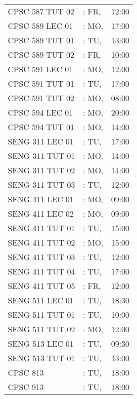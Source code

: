 \documentclass[11pt]{article}
\begin{document}
\begin{longtable}{l l r}
CPSC 587 TUT 02               &\hspace*{1.5cm}: FR,& 12:00\tabularnewline
CPSC 589 LEC 01               &\hspace*{1.5cm}: MO,& 17:00\tabularnewline
CPSC 589 TUT 01               &\hspace*{1.5cm}: TU,& 13:00\tabularnewline
CPSC 589 TUT 02               &\hspace*{1.5cm}: FR,& 10:00\tabularnewline
CPSC 591 LEC 01               &\hspace*{1.5cm}: MO,& 12:00\tabularnewline
CPSC 591 TUT 01               &\hspace*{1.5cm}: TU,& 17:00\tabularnewline
CPSC 591 TUT 02               &\hspace*{1.5cm}: MO,& 08:00\tabularnewline
CPSC 594 LEC 01               &\hspace*{1.5cm}: MO,& 20:00\tabularnewline
CPSC 594 TUT 01               &\hspace*{1.5cm}: MO,& 14:00\tabularnewline
SENG 311 LEC 01               &\hspace*{1.5cm}: TU,& 17:00\tabularnewline
SENG 311 TUT 01               &\hspace*{1.5cm}: MO,& 14:00\tabularnewline
SENG 311 TUT 02               &\hspace*{1.5cm}: MO,& 14:00\tabularnewline
SENG 311 TUT 03               &\hspace*{1.5cm}: TU,& 12:00\tabularnewline
SENG 411 LEC 01               &\hspace*{1.5cm}: MO,& 09:00\tabularnewline
SENG 411 LEC 02               &\hspace*{1.5cm}: MO,& 09:00\tabularnewline
SENG 411 TUT 01               &\hspace*{1.5cm}: TU,& 15:00\tabularnewline
SENG 411 TUT 02               &\hspace*{1.5cm}: MO,& 15:00\tabularnewline
SENG 411 TUT 03               &\hspace*{1.5cm}: TU,& 12:00\tabularnewline
SENG 411 TUT 04               &\hspace*{1.5cm}: TU,& 17:00\tabularnewline
SENG 411 TUT 05               &\hspace*{1.5cm}: FR,& 12:00\tabularnewline
SENG 511 LEC 01               &\hspace*{1.5cm}: TU,& 18:30\tabularnewline
SENG 511 TUT 01               &\hspace*{1.5cm}: TU,& 10:00\tabularnewline
SENG 511 TUT 02               &\hspace*{1.5cm}: MO,& 12:00\tabularnewline
SENG 513 LEC 01               &\hspace*{1.5cm}: TU,& 09:30\tabularnewline
SENG 513 TUT 01               &\hspace*{1.5cm}: TU,& 13:00\tabularnewline
CPSC 813                      &\hspace*{1.5cm}: TU,& 18:00\tabularnewline
CPSC 913                      &\hspace*{1.5cm}: TU,& 18:00\tabularnewline

\end{longtable}
\end{document}

